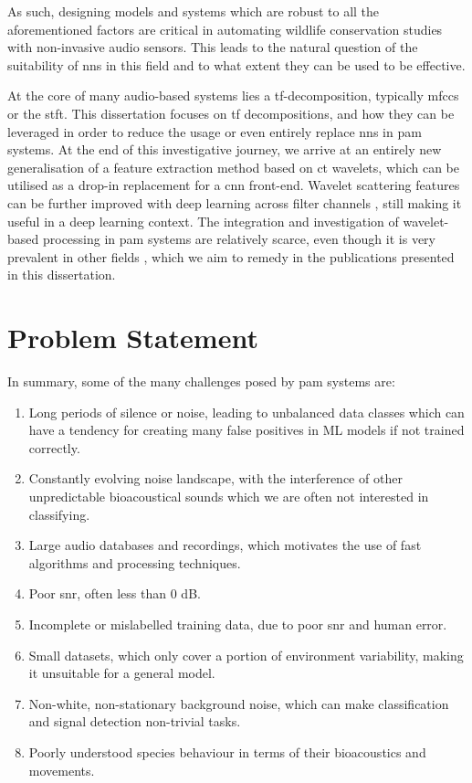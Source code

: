 As such, designing models and systems which are robust to all the aforementioned factors are critical in automating wildlife conservation studies with non-invasive audio sensors. This leads to the natural question of the suitability of \acp{nn} in this field and to what extent they can be used to be effective.

At the core of many audio-based systems lies a \ac{tf}-decomposition, typically \acp{mfcc} or the \ac{stft}. This dissertation focuses on \ac{tf} decompositions, and how they can be leveraged in order to reduce the usage or even entirely replace \acp{nn} in \ac{pam} systems. At the end of this investigative journey, we arrive at an entirely new generalisation of a feature extraction method based on \ac{ct} wavelets, which can be utilised as a drop-in replacement for a \ac{cnn} front-end. Wavelet scattering features can be further improved with deep learning across filter channels \cite{nnphasecollapse}, still making it useful in a deep learning context. The integration and investigation of wavelet-based processing in \ac{pam} systems are relatively scarce, even though it is very prevalent in other fields \citep{denoising,ws_fault_diag, waveletfault, waveletflight, waveletflow, waveletimagedenoising}, which we aim to remedy in the publications presented in this dissertation.

\section{Problem Statement}
\label{sec:problem}

In summary, some of the many challenges posed by \ac{pam} systems are:
\begin{enumerate}
    \item Long periods of silence or noise, leading to unbalanced data classes which can have a tendency for creating many false positives in ML models if not trained correctly.
    \item Constantly evolving noise landscape, with the interference of other unpredictable bioacoustical sounds which we are often not interested in classifying.
    \item Large audio databases and recordings, which motivates the use of fast algorithms and processing techniques.
    \item Poor \ac{snr}, often less than 0 dB.
    \item Incomplete or mislabelled training data, due to poor \ac{snr} and human error.
    \item Small datasets, which only cover a portion of environment variability, making it unsuitable for a general model.
    \item Non-white, non-stationary background noise, which can make classification and signal detection non-trivial tasks.
    \item Poorly understood species behaviour in terms of their bioacoustics and movements.
\end{enumerate}

